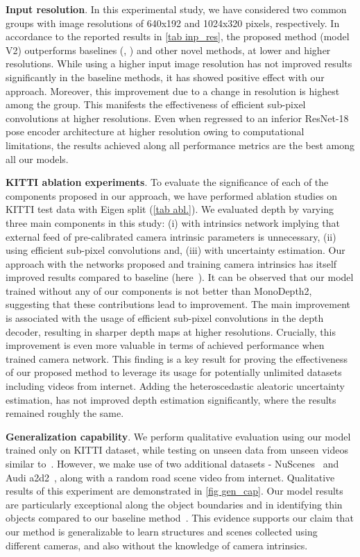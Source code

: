 \documentclass{bmvc2k}
\begin{document}
\textbf{Input resolution}. In this experimental study, we have considered two common groups with image resolutions of 640x192 and 1024x320 pixels, respectively. In accordance to the reported results in \autoref{tab inp_res}, the proposed method (model V2) outperforms baselines (\cite{godard2019digging}, \cite{tosi2020distilled}) and other novel methods, at lower and higher resolutions. While using a higher input image resolution has not improved results significantly in the baseline methods, it has showed positive effect with our approach. Moreover, this improvement due to a change in resolution is highest among the group. This manifests the effectiveness of efficient sub-pixel convolutions at higher resolutions. Even when regressed to an inferior ResNet-18 pose encoder architecture at higher resolution owing to computational limitations, the results achieved along all performance metrics are the best among all our models.

\textbf{KITTI ablation experiments}. To evaluate the significance of each of the components proposed in our approach, we have performed ablation studies on KITTI test data with Eigen split (\autoref{tab abl.}). We evaluated depth by varying three main components in this study: (i) with intrinsics network implying that external feed of pre-calibrated camera intrinsic parameters is unnecessary, (ii) using efficient sub-pixel convolutions and, (iii) with uncertainty estimation. Our approach with the networks proposed and training camera intrinsics has itself improved results compared to baseline (here~\cite{godard2019digging}). It can be observed that our model trained without any of our components is not better than MonoDepth2, suggesting that these  contributions lead to improvement. The main improvement is associated with the usage of efficient sub-pixel convolutions in the depth decoder, resulting in sharper depth maps at higher resolutions. Crucially, this improvement is even more valuable in terms of achieved performance when trained camera network. This finding is a key result for proving the effectiveness of our proposed method to leverage its usage for potentially unlimited datasets including videos from internet. Adding the heteroscedastic aleatoric uncertainty estimation, has not improved depth estimation significantly, where the results remained roughly the same.


\textbf{Generalization capability}. We perform qualitative evaluation using our model trained only on KITTI dataset, while testing on unseen data from unseen videos similar to~\cite{chen2019self}. However, we make use of two additional datasets - NuScenes~\cite{caesar2020nuscenes} and Audi a2d2~\cite{geyer2020a2d2}, along with a random road scene video from internet. Qualitative results of this experiment are demonstrated in \autoref{fig gen_cap}. Our model results are particularly exceptional along the object boundaries and in identifying thin objects compared to our baseline method~\cite{godard2019digging}. This evidence supports our claim that our method is generalizable to learn structures and scenes collected using different cameras, and also without the knowledge of camera intrinsics.
\end{document}
